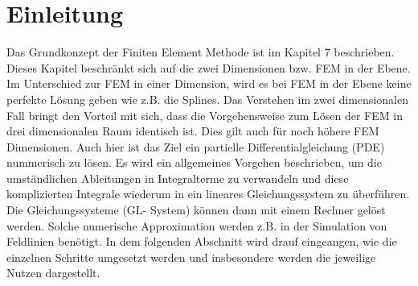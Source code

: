 %
%
%
\section{Einleitung\label{fem:section:einleitung}}
Das Grundkonzept der Finiten Element Methode ist im Kapitel 7 beschrieben. Dieses  Kapitel beschränkt sich auf die zwei Dimensionen bzw. FEM in der Ebene. Im Unterschied zur FEM in einer Dimension, wird es bei FEM in der Ebene keine perfekte Lösung geben wie z.B. die Splines. Das Verstehen im zwei dimensionalen Fall bringt den Vorteil mit sich, dass die Vorgehensweise zum Lösen der FEM in drei dimensionalen Raum identisch ist. Dies gilt auch für noch höhere FEM Dimensionen. Auch hier ist das Ziel ein partielle Differentialgleichung (PDE) nummerisch zu lösen. Es wird ein allgemeines Vorgehen beschrieben, um die umständlichen Ableitungen in Integralterme zu verwandeln und diese komplizierten Integrale wiederum in ein lineares Gleichungssystem zu überführen. Die Gleichungssysteme (GL- System) können dann mit einem Rechner gelöst  werden. Solche numerische Approximation werden z.B. in der Simulation von Feldlinien benötigt. 
In dem folgenden Abschnitt wird drauf eingeangen, wie die einzelnen Schritte umgesetzt werden und insbesondere werden die jeweilige Nutzen dargestellt.

